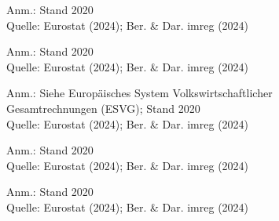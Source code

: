 \begin{figure}[p]
	{\centering {}}
	\label{map:einkommenverm}
	\begin{spacing}{1} \scriptsize
		Anm.: Stand 2020\\
		Quelle: Eurostat (2024); Ber. \& Dar. imreg (2024) \end{spacing}
\end{figure}


\begin{figure}[p]
	{\centering {}}
	\label{map:einkommensozial}
	\begin{spacing}{1} \scriptsize
		Anm.: Stand 2020\\
		Quelle: Eurostat (2024); Ber. \& Dar. imreg (2024) \end{spacing}
\end{figure}


\begin{figure}[p]
	{\centering {}}
	\label{map:einkommensonst}
	\begin{spacing}{1} \scriptsize
		Anm.: Siehe Europäisches System Volkswirtschaftlicher Gesamtrechnungen (ESVG); Stand 2020\\
		Quelle: Eurostat (2024); Ber. \& Dar. imreg (2024) \end{spacing}
\end{figure}


\begin{figure}[p]
	{\centering {}}
	\label{map:einkommensteuer}
	\begin{spacing}{1} \scriptsize
		Anm.: Stand 2020\\
		Quelle: Eurostat (2024); Ber. \& Dar. imreg (2024) \end{spacing}
\end{figure}


\begin{figure}[p]
	{\centering {}}
	\label{map:einkommenbeiträge}
	\begin{spacing}{1} \scriptsize
		Anm.: Stand 2020\\
		Quelle: Eurostat (2024); Ber. \& Dar. imreg (2024) \end{spacing}
\end{figure}